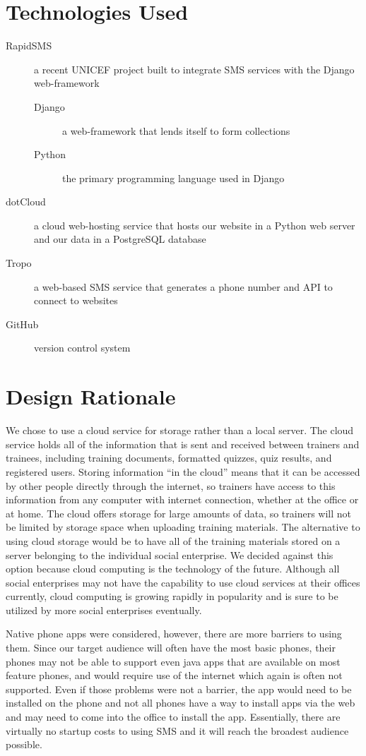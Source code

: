 \section{Technologies Used}
\begin{description}
	\item[RapidSMS] a recent UNICEF project built to integrate SMS services with the Django web-framework
	\begin{description}
		\item[Django] a web-framework that lends itself to form collections
		\item[Python] the primary programming language used in Django
	\end{description}
	\item[dotCloud] a cloud web-hosting service that hosts our website in a Python web server and our data in a PostgreSQL database
	\item[Tropo] a web-based SMS service that generates a phone number and API to connect to websites
	\item[GitHub] version control system
\end{description}

\section{Design Rationale}

We chose to use a cloud service for storage rather than a local server. The cloud service holds all of the information that is sent and received between trainers and trainees, including training documents, formatted quizzes, quiz results, and registered users. Storing information “in the cloud” means that it can be accessed by other people directly through the internet, so trainers have access to this information from any computer with internet connection, whether at the office or at home. The cloud offers storage for large amounts of data, so trainers will not be limited by storage space when uploading training materials. The alternative to using cloud storage would be to have all of the training materials stored on a server belonging to the individual social enterprise. We decided against this option because cloud computing is the technology of the future. Although all social enterprises may not have the capability to use cloud services at their offices currently, cloud computing is growing rapidly in popularity and is sure to be utilized by more social enterprises eventually.

Native phone apps were considered, however, there are more barriers to using them. Since our target audience will often have the most basic phones, their phones may not be able to support even java apps that are available on most feature phones, and would require use of the internet which again is often not supported. Even if those problems were not a barrier, the app would need to be installed on the phone and not all phones have a way to install apps via the web and may need to come into the office to install the app. Essentially, there are virtually no startup costs to using SMS and it will reach the broadest audience possible.

